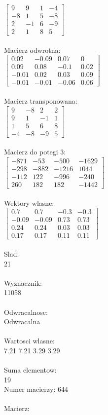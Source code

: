 \documentclass[a4paper,12pt]{article}
\begin{document}
$\begin{bmatrix} 9&9&1&-4\\-8&1&5&-8\\2&-1&6&-9\\2&1&8&5 \end{bmatrix}$
\\
\\
Macierz odwrotna:\\

$\begin{bmatrix} 0.02&-0.09&0.07&0\\0.09&0.08&-0.1&0.02\\-0.01&0.02&0.03&0.09\\-0.01&-0.01&-0.06&0.06 \end{bmatrix}$
\\
\\
Macierz transponowana:\\

$\begin{bmatrix} 9&-8&2&2\\9&1&-1&1\\1&5&6&8\\-4&-8&-9&5 \end{bmatrix}$
\\
\\
Macierz do potegi 3:\\

$\begin{bmatrix} -871&-53&-500&-1629\\-298&-882&-1216&1044\\-112&122&-996&-240\\260&182&182&-1442 \end{bmatrix}$
\\
\\
Wektory wlasne:\\

$\begin{bmatrix} 0.7&0.7&-0.3&-0.3\\-0.09&-0.09&0.73&0.73\\0.24&0.24&0.03&0.03\\0.17&0.17&0.11&0.11 \end{bmatrix}$
\\
\\
Slad:\\
21
\\
\\
Wyznacznik:\\
11058
\\
\\
Odwracalnosc:\\
Odwracalna
\\
\\
Wartosci wlasne:\\
7.21 7.21 3.29 3.29
\\
\\
Suma elementow:\\
19
\\
\newpage
Numer macierzy:
644
\\
\\
Macierz:\\
\end{document}
